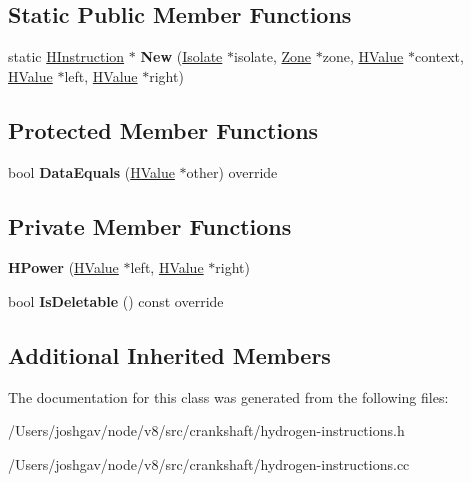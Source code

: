 \subsection*{Static Public Member Functions}
\begin{DoxyCompactItemize}
\item 
static \hyperlink{classv8_1_1internal_1_1_h_instruction}{H\+Instruction} $\ast$ {\bfseries New} (\hyperlink{classv8_1_1internal_1_1_isolate}{Isolate} $\ast$isolate, \hyperlink{classv8_1_1internal_1_1_zone}{Zone} $\ast$zone, \hyperlink{classv8_1_1internal_1_1_h_value}{H\+Value} $\ast$context, \hyperlink{classv8_1_1internal_1_1_h_value}{H\+Value} $\ast$left, \hyperlink{classv8_1_1internal_1_1_h_value}{H\+Value} $\ast$right)\hypertarget{classv8_1_1internal_1_1_h_power_a5789940945308acd27d27696a90f9ce9}{}\label{classv8_1_1internal_1_1_h_power_a5789940945308acd27d27696a90f9ce9}

\end{DoxyCompactItemize}
\subsection*{Protected Member Functions}
\begin{DoxyCompactItemize}
\item 
bool {\bfseries Data\+Equals} (\hyperlink{classv8_1_1internal_1_1_h_value}{H\+Value} $\ast$other) override\hypertarget{classv8_1_1internal_1_1_h_power_a09a648577a1e538231f04954521ca7d7}{}\label{classv8_1_1internal_1_1_h_power_a09a648577a1e538231f04954521ca7d7}

\end{DoxyCompactItemize}
\subsection*{Private Member Functions}
\begin{DoxyCompactItemize}
\item 
{\bfseries H\+Power} (\hyperlink{classv8_1_1internal_1_1_h_value}{H\+Value} $\ast$left, \hyperlink{classv8_1_1internal_1_1_h_value}{H\+Value} $\ast$right)\hypertarget{classv8_1_1internal_1_1_h_power_a512a3d09436352ca2005b87cba9c7589}{}\label{classv8_1_1internal_1_1_h_power_a512a3d09436352ca2005b87cba9c7589}

\item 
bool {\bfseries Is\+Deletable} () const  override\hypertarget{classv8_1_1internal_1_1_h_power_a840494852357f4aaa2e389dbf541c0f7}{}\label{classv8_1_1internal_1_1_h_power_a840494852357f4aaa2e389dbf541c0f7}

\end{DoxyCompactItemize}
\subsection*{Additional Inherited Members}


The documentation for this class was generated from the following files\+:\begin{DoxyCompactItemize}
\item 
/\+Users/joshgav/node/v8/src/crankshaft/hydrogen-\/instructions.\+h\item 
/\+Users/joshgav/node/v8/src/crankshaft/hydrogen-\/instructions.\+cc\end{DoxyCompactItemize}
